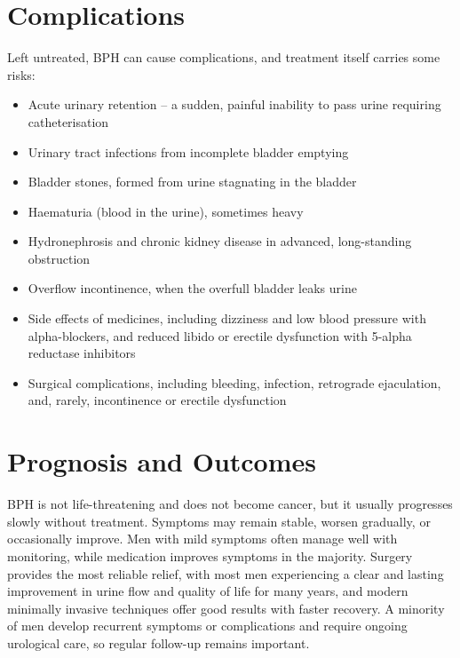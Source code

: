 \section*{Complications}
Left untreated, BPH can cause complications, and treatment itself carries some risks:
\begin{itemize}
    \item Acute urinary retention -- a sudden, painful inability to pass urine requiring catheterisation
    \item Urinary tract infections from incomplete bladder emptying
    \item Bladder stones, formed from urine stagnating in the bladder
    \item Haematuria (blood in the urine), sometimes heavy
    \item Hydronephrosis and chronic kidney disease in advanced, long-standing obstruction
    \item Overflow incontinence, when the overfull bladder leaks urine
    \item Side effects of medicines, including dizziness and low blood pressure with alpha-blockers, and reduced libido or erectile dysfunction with 5-alpha reductase inhibitors
    \item Surgical complications, including bleeding, infection, retrograde ejaculation, and, rarely, incontinence or erectile dysfunction
\end{itemize}

\section*{Prognosis and Outcomes}
BPH is not life-threatening and does not become cancer, but it usually progresses slowly without treatment. Symptoms may remain stable, worsen gradually, or occasionally improve. Men with mild symptoms often manage well with monitoring, while medication improves symptoms in the majority. Surgery provides the most reliable relief, with most men experiencing a clear and lasting improvement in urine flow and quality of life for many years, and modern minimally invasive techniques offer good results with faster recovery. A minority of men develop recurrent symptoms or complications and require ongoing urological care, so regular follow-up remains important.

